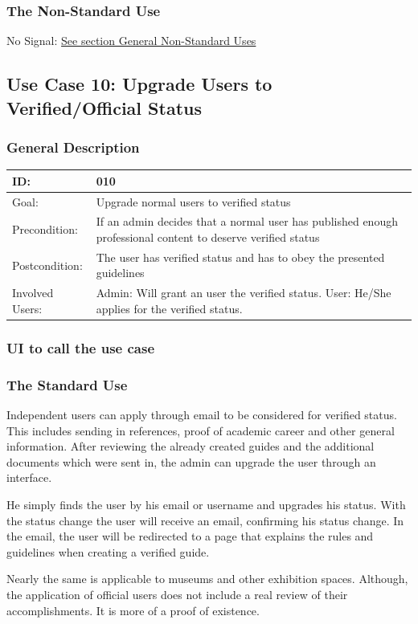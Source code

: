 \documentclass[12pt]{article}
\theoremstyle{definition}
\newenvironment{text}{
   \setlength{\parindent}{0pt}
   \color{black}
}{}
\begin{document}
    \subsubsection{The Non-Standard Use}
    
    No Signal: \hyperref[sec:gnsu]{See section General Non-Standard Uses } 

\subsection{Use Case 10: Upgrade Users to Verified/Official Status}
    \subsubsection{General Description}
    \begin{tabular}{|p{.2\linewidth}|p{.65\linewidth}|}
    \hline 
    ID: & 010 \\ \hline
    Goal: & Upgrade normal users to verified status \\ \hline
    Precondition: & If an admin decides that a normal user has published enough professional content to deserve verified status \\ \hline
    Postcondition: & The user has verified status and has to obey the presented guidelines\\ \hline
    Involved Users: & Admin: Will grant an user the verified status.
    User: He/She applies for the verified status. \\ \hline
    \end{tabular}
    
    \subsubsection{UI to call the use case}
    
    \subsubsection{The Standard Use}
    \begin{text}
    Independent users can apply through email to be considered for verified status. This includes sending in references, proof of academic career and other general information. After reviewing the already created guides and the additional documents which were sent in, the admin can upgrade the user through an interface. 
   
   He simply finds the user by his email or username and upgrades his status. With the status change the user will receive an email, confirming his status change. In the email, the user will be redirected to a page that explains the rules and guidelines when creating a verified guide.
   
   
   Nearly the same is applicable to museums and other exhibition spaces. Although, the application of official users does not include a real review of their accomplishments. It is more of a proof of existence.
    \end{text}
    
\end{document}
